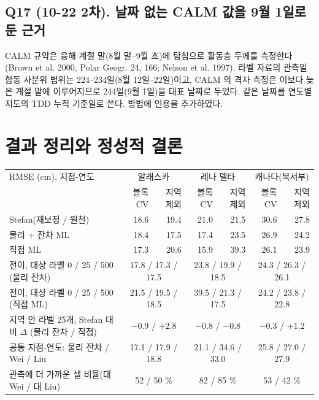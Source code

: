 \documentclass[10pt,a4paper]{article}
\begin{document}
\subsection*{Q17 (10-22 2차). 날짜 없는 CALM 값을 9월 1일로 둔 근거}
CALM 규약은 융해 계절 말(8월 말--9월 초)에 탐침으로 활동층 두께를 측정한다(Brown et al. 2000, Polar Geogr. 24, 166; Nelson et al. 1997). 라벨 자료의 관측일 합동 사분위 범위는 224--234일(8월 12일--22일)이고, CALM 의 격자 측정은 이보다 늦은 계절 말에 이루어지므로 244일(9월 1일)을 대표 날짜로 두었다. 같은 날짜를 연도별 지도의 TDD 누적 기준일로 쓴다. 방법에 인용을 추가하였다.

\section{결과 정리와 정성적 결론}
\begin{small}\begin{tabular}{@{}lrrrrrr@{}}\toprule
RMSE (cm), 지점-연도 & \multicolumn{2}{c}{알래스카} & \multicolumn{2}{c}{레나 델타} & \multicolumn{2}{c}{캐나다(북서부)} \\
 & 블록 CV & 지역 제외 & 블록 CV & 지역 제외 & 블록 CV & 지역 제외 \\ \midrule
Stefan(재보정 / 원천) & 18.6 & 19.4 & 21.0 & 21.5 & 30.6 & 27.8 \\
물리 + 잔차 ML & 18.4 & 17.5 & 17.4 & 23.5 & 26.9 & 24.2 \\
직접 ML & 17.3 & 20.6 & 15.9 & 39.3 & 26.1 & 23.9 \\ \midrule
전이, 대상 라벨 0 / 25 / 500 (물리 잔차) & \multicolumn{2}{c}{17.8 / 17.3 / 17.5} & \multicolumn{2}{c}{23.8 / 19.9 / 18.5} & \multicolumn{2}{c}{24.3 / 26.3 / 26.1} \\
전이, 대상 라벨 0 / 25 / 500 (직접 ML) & \multicolumn{2}{c}{21.5 / 19.5 / 18.5} & \multicolumn{2}{c}{39.5 / 21.3 / 17.5} & \multicolumn{2}{c}{24.2 / 23.8 / 22.8} \\
지역 안 라벨 25개, Stefan 대비 $\Delta$ (물리 잔차 / 직접) & \multicolumn{2}{c}{$-0.9$ / $+2.8$} & \multicolumn{2}{c}{$-0.8$ / $-0.8$} & \multicolumn{2}{c}{$-0.3$ / $+1.2$} \\
공통 지점-연도: 물리 잔차 / Wei / Liu & \multicolumn{2}{c}{17.1 / 17.9 / 18.8} & \multicolumn{2}{c}{21.1 / 34.6 / 33.0} & \multicolumn{2}{c}{25.8 / 27.0 / 27.9} \\
관측에 더 가까운 셀 비율(대 Wei / 대 Liu) & \multicolumn{2}{c}{52 / 50 \%} & \multicolumn{2}{c}{82 / 85 \%} & \multicolumn{2}{c}{53 / 42 \%} \\
\bottomrule\end{tabular}\end{small}
\end{document}
